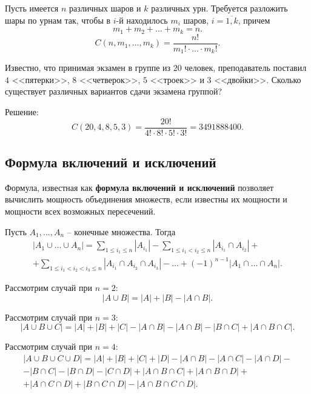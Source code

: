 Пусть имеется \(n\) различных шаров и \(k\) различных урн. Требуется разложить шары по урнам так, чтобы в \(i\)-й находилось \(m_i\) шаров, \(i = \overline{1, k}\), причем
\[
    m_1 + m_2 + \ldots + m_k = n.
\]
\[
    C(n, m_1, \ldots, m_k) = \frac{n!}{m_1! \cdot \ldots \cdot m_k!}.
\]

\begin{example}
    Известно, что принимая экзамен в группе из \(20\) человек, преподаватель поставил \(4\) <<пятерки>>, \(8\) <<четверок>>, \(5\) <<троек>> и \(3\) <<двойки>>. Сколько существует различных вариантов сдачи экзамена группой?

    Решение:
    \[
        C(20, 4, 8, 5, 3) = \frac{20!}{4! \cdot 8! \cdot 5! \cdot 3!} = 3491888400.
    \]
\end{example}

\subsection{Формула включений и исключений}

Формула, известная как \textbf{формула включений и исключений} позволяет вычислить мощность объединения множеств, если известны их мощности и мощности всех возможных пересечений.

\begin{theorem*}
    Пусть \(A_1, \ldots, A_n\) -- конечные множества. Тогда
    \begin{gather*}
        |A_1 \cup \ldots \cup A_n| =
        \sum_{1 \leq i_1 \leq n} |A_{i_1}| - \sum_{1 \leq i_1 < i_2 \leq n} |A_{i_1} \cap A_{i_2}| + \\ + \sum_{1 \leq i_1 < i_2 < i_3 \leq n} |A_{i_1} \cap A_{i_2} \cap A_{i_3}| - \ldots + (-1)^{n - 1} |A_1 \cap \ldots \cap A_n|.
    \end{gather*}
\end{theorem*}

\noindent Рассмотрим случай при \(n = 2\):
\[
    |A \cup B| = |A| + |B| - |A \cap B|.
\]

\noindent Рассмотрим случай при \(n = 3\):
\[
    |A \cup B \cup C| = |A| + |B| + |C| - |A \cap B|  - |A \cap B| - |B \cap C| + |A \cap B \cap C|.
\]

\noindent Рассмотрим случай при \(n = 4\):
\begin{gather*}
    |A \cup B \cup C \cup D| =
    |A| + |B| + |C| + |D| - |A \cap B| - |A \cap C| - |A \cap D| - \\ - |B \cap C| - |B \cap D| - |C \cap D| + |A \cap B \cap C| + |A \cap B \cap D| + \\ + |A \cap C \cap D| + |B \cap C \cap D| - |A \cap B \cap C \cap D|.
\end{gather*}

